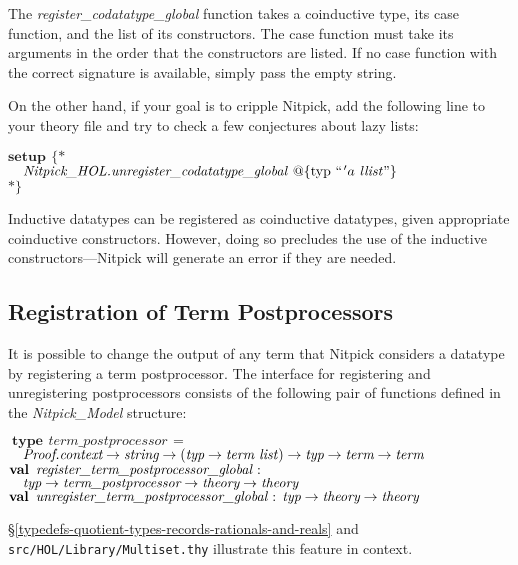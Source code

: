 \documentclass[a4paper,12pt]{article}
\begin{document}
The \textit{register\_codatatype\_global\/} function takes a coinductive type, its
case function, and the list of its constructors. The case function must take its
arguments in the order that the constructors are listed. If no case function
with the correct signature is available, simply pass the empty string.

On the other hand, if your goal is to cripple Nitpick, add the following line to
your theory file and try to check a few conjectures about lazy lists:

\prew
$\textbf{setup}~\,\{{*}$ \\
$\hbox{}\quad\textit{Nitpick\_HOL.unregister\_codatatype\_global\/}~@\{\textrm{typ}~``\kern1pt'a~\textit{llist\/}\textrm{''}\}$ \\
${*}\}$
\postw

Inductive datatypes can be registered as coinductive datatypes, given
appropriate coinductive constructors. However, doing so precludes
the use of the inductive constructors---Nitpick will generate an error if they
are needed.

\subsection{Registration of Term Postprocessors}
\label{registration-of-term-postprocessors}

It is possible to change the output of any term that Nitpick considers a
datatype by registering a term postprocessor. The interface for registering and
unregistering postprocessors consists of the following pair of functions defined
in the \textit{Nitpick\_Model} structure:

\prew
$\textbf{type}\,~\textit{term\_postprocessor}\,~{=} {}$ \\
$\hbox{}\quad\textit{Proof.context} \rightarrow \textit{string} \rightarrow (\textit{typ} \rightarrow \textit{term~list\/}) \rightarrow \textit{typ} \rightarrow \textit{term} \rightarrow \textit{term}$ \\
$\textbf{val}\,~\textit{register\_term\_postprocessor\_global\/} : {}$ \\
$\hbox{}\quad\textit{typ} \rightarrow \textit{term\_postprocessor} \rightarrow \textit{theory} \rightarrow \textit{theory}$ \\
$\textbf{val}\,~\textit{unregister\_term\_postprocessor\_global\/} :\,
\textit{typ} \rightarrow \textit{theory} \rightarrow \textit{theory}$
\postw

\S\ref{typedefs-quotient-types-records-rationals-and-reals} and
\texttt{src/HOL/Library/Multiset.thy} illustrate this feature in context.
\end{document}
